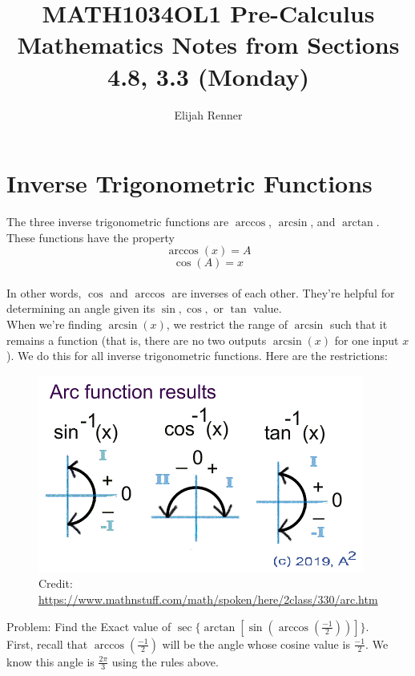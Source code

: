 \documentclass[12pt]{article}
\title{MATH1034OL1 Pre-Calculus Mathematics Notes from Sections 4.8, 3.3 (Monday)}
\author{Elijah Renner}
\begin{document}
\maketitle

\vspace{0.5in}

\tableofcontents

\section{Inverse Trigonometric Functions}

The three inverse trigonometric functions are \(\arccos\), \(\arcsin\), and \(\arctan\). These functions have the property\\

\[\arccos(x)=A\]
\[\cos(A)=x\]\\

In other words, \(\cos\) and \(\arccos\) are inverses of each other. They're helpful for determining an angle given its \(\sin, \cos,\) or \(\tan\) value.\\

When we're finding \(\arcsin(x)\), we restrict the range of \(\arcsin\) such that it remains a function (that is, there are no two outputs \(\arcsin(x)\) for one input \(x\)). We do this for all inverse trigonometric functions. Here are the restrictions:\\

\begin{figure}[H]
	\centering
	\includegraphics[scale=0.6]{arcf.gif}
	\caption{Credit: \url{https://www.mathnstuff.com/math/spoken/here/2class/330/arc.htm}}
\end{figure}

Problem: Find the Exact value of \(\sec\{\arctan[\sin(\arccos(\frac{-1}{2}))]\}\).\\

First, recall that \(\arccos(\frac{-1}{2})\) will be the angle whose cosine value is \(\frac{-1}{2}\). We know this angle is \(\frac{2\pi}{3}\) using the rules above.\\
\end{document}
